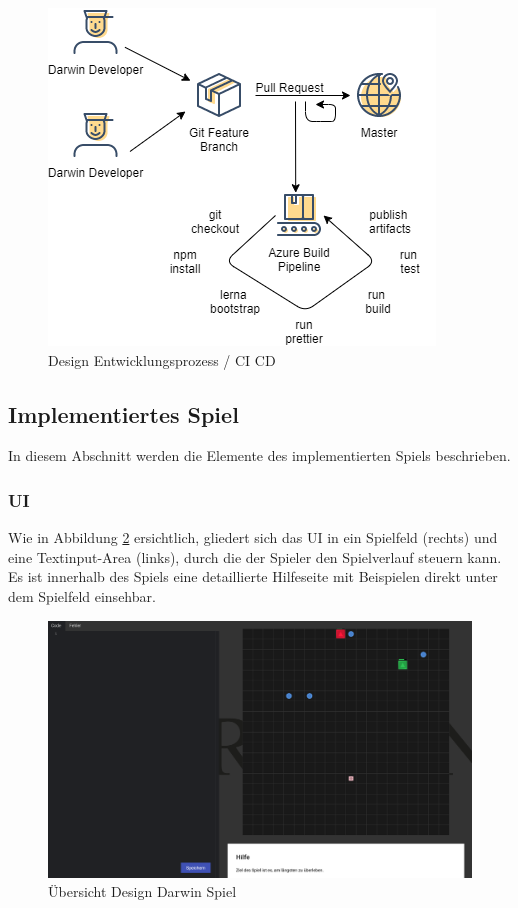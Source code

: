 \documentclass[11pt,a4paper,titlepage]{article}
\begin{document}
\begin{figure}[H]
	\centering
	\includegraphics{workflow.png}
	\caption{Design Entwicklungsprozess / CI CD}
	\label{pipeline}
\end{figure}

\subsection{Implementiertes Spiel}

In diesem Abschnitt werden die Elemente des implementierten Spiels beschrieben.

\subsubsection{UI}

Wie in Abbildung \ref{gameplay} ersichtlich, gliedert sich das UI in ein Spielfeld (rechts) und eine Textinput-Area (links), durch die der Spieler den Spielverlauf steuern kann. Es ist innerhalb des Spiels eine detaillierte Hilfeseite mit Beispielen direkt unter dem Spielfeld einsehbar.

\begin{figure}[H]
	\centering
	\includegraphics[width=\textwidth]{darwin-gameplay.png}
	\caption{Übersicht Design Darwin Spiel}
	\label{gameplay}
\end{figure}
\end{document}
